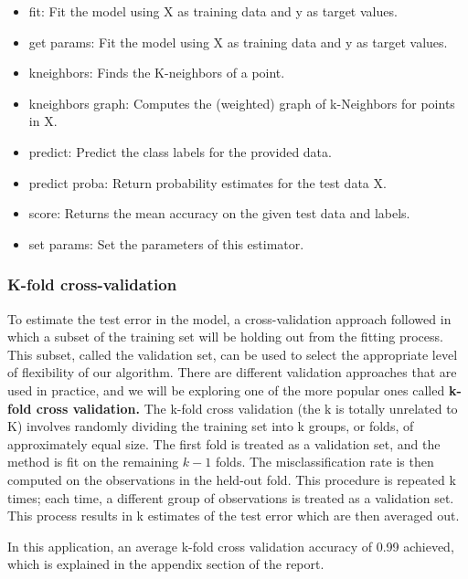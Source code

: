 \documentclass[sigconf]{acmart}
\begin{document}
\begin{itemize}
\item fit: Fit the model using X as training data and y as target values.
\item get params: Fit the model using X as training data and y as target values.
\item kneighbors: Finds the K-neighbors of a point.
\item kneighbors graph: Computes the (weighted) graph of k-Neighbors for points in X.
\item predict: Predict the class labels for the provided data.
\item predict proba: Return probability estimates for the test data X.
\item score: Returns the mean accuracy on the given test data and labels.
\item set params: Set the parameters of this estimator.
\end{itemize}

\subsubsection{K-fold cross-validation}
To estimate the test error in the model, a cross-validation approach followed in which a subset of the training set will be holding out from the fitting process. This subset, called the validation set, can be used to select the appropriate level of flexibility of our algorithm. There are different validation approaches that are used in practice, and we will be exploring one of the more popular ones called \textbf{k-fold cross validation.}
The k-fold cross validation (the k is totally unrelated to K) involves randomly dividing the training set into k groups, or folds, of approximately equal size. The first fold is treated as a validation set, and the method is fit on the remaining \(k-1\) folds. The misclassification rate is then computed on the observations in the held-out fold. This procedure is repeated k times; each time, a different group of observations is treated as a validation set. This process results in k estimates of the test error which are then averaged out. 

In this application, an average k-fold cross validation accuracy of 0.99 achieved, which is explained in the appendix section of the report.
\end{document}
